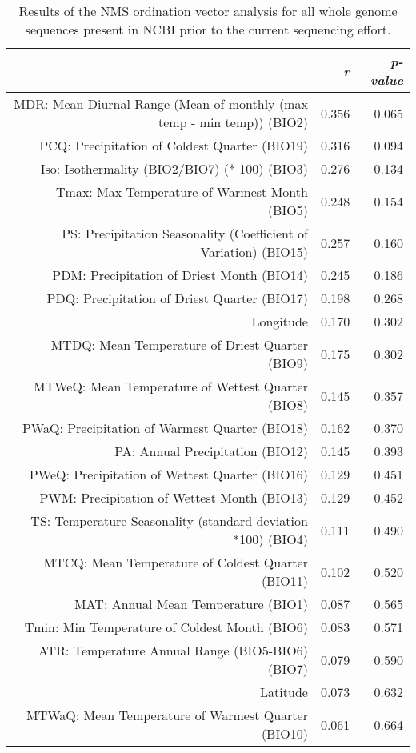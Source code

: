 \begin{table}[ht]
\centering
\begin{tabular}{rrr}
  \hline
 & {\emph{r}} & {\emph{p-value}} \\ 
  \hline
MDR: Mean Diurnal Range (Mean of monthly (max temp - min temp)) (BIO2) & 0.356 & 0.065 \\ 
  PCQ: Precipitation of Coldest Quarter (BIO19) & 0.316 & 0.094 \\ 
  Iso: Isothermality (BIO2/BIO7) (* 100) (BIO3) & 0.276 & 0.134 \\ 
  Tmax: Max Temperature of Warmest Month (BIO5) & 0.248 & 0.154 \\ 
  PS: Precipitation Seasonality (Coefficient of Variation) (BIO15) & 0.257 & 0.160 \\ 
  PDM: Precipitation of Driest Month (BIO14) & 0.245 & 0.186 \\ 
  PDQ: Precipitation of Driest Quarter (BIO17) & 0.198 & 0.268 \\ 
  Longitude & 0.170 & 0.302 \\ 
  MTDQ: Mean Temperature of Driest Quarter (BIO9) & 0.175 & 0.302 \\ 
  MTWeQ: Mean Temperature of Wettest Quarter (BIO8) & 0.145 & 0.357 \\ 
  PWaQ: Precipitation of Warmest Quarter (BIO18) & 0.162 & 0.370 \\ 
  PA: Annual Precipitation (BIO12) & 0.145 & 0.393 \\ 
  PWeQ: Precipitation of Wettest Quarter (BIO16) & 0.129 & 0.451 \\ 
  PWM: Precipitation of Wettest Month (BIO13) & 0.129 & 0.452 \\ 
  TS: Temperature Seasonality (standard deviation *100) (BIO4) & 0.111 & 0.490 \\ 
  MTCQ: Mean Temperature of Coldest Quarter (BIO11) & 0.102 & 0.520 \\ 
  MAT: Annual Mean Temperature (BIO1) & 0.087 & 0.565 \\ 
  Tmin: Min Temperature of Coldest Month (BIO6) & 0.083 & 0.571 \\ 
  ATR: Temperature Annual Range (BIO5-BIO6) (BIO7) & 0.079 & 0.590 \\ 
  Latitude & 0.073 & 0.632 \\ 
  MTWaQ: Mean Temperature of Warmest Quarter (BIO10) & 0.061 & 0.664 \\ 
   \hline
\end{tabular}
\caption{Results of the NMS ordination vector analysis for all whole genome sequences present in NCBI prior to the current sequencing effort.} 
\label{tab:wc_napg_vec}
\end{table}
